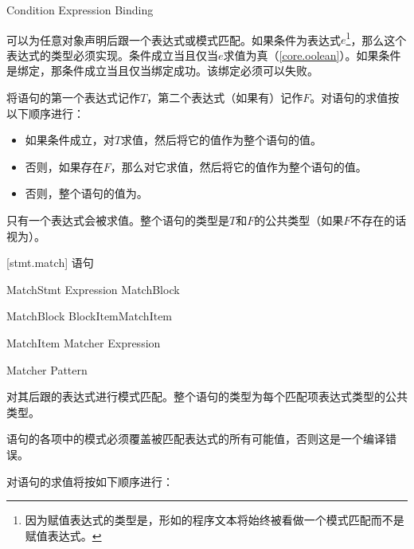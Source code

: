 \begin{bnf}{Condition}
    Expression \br
    Binding
\end{bnf}

\pnum
{}可以为任意对象声明后跟一个表达式或模式匹配。如果条件为表达式$e$\footnote{因为赋值表达式的类型是，形如的程序文本将始终被看做一个模式匹配而不是赋值表达式。}，那么这个表达式的类型必须实现。条件成立当且仅当$e$求值为真（\ref{core.oolean}）。如果条件是绑定，那条件成立当且仅当绑定成功。该绑定必须可以失败。

\pnum
将语句的第一个表达式记作$T$，第二个表达式（如果有）记作$F$。对语句的求值按以下顺序进行：

\begin{itemize}

\item 如果条件成立，对$T$求值，然后将它的值作为整个语句的值。
\item 否则，如果存在$F$，那么对它求值，然后将它的值作为整个语句的值。
\item 否则，整个语句的值为\tcode{()}。

\end{itemize}

只有一个表达式会被求值。整个语句的类型是$T$和$F$的公共类型（如果$F$不存在的话视为）。

[stmt.match]{ 语句}

\begin{bnf}{MatchStmt}
     Expression MatchBlock
\end{bnf}

\begin{bnf}{MatchBlock}
    \terminal{\{} BlockItem\bnfs MatchItem\bnfs \terminal{\}}
\end{bnf}

\begin{bnf}{MatchItem}
    Matcher Expression\bnfp
\end{bnf}

\begin{bnf}{Matcher}
    Pattern \terminal{->}
\end{bnf}

\pnum
{}对其后跟的表达式进行模式匹配。整个语句的类型为每个匹配项表达式类型的公共类型。

\pnum
{}语句的各项中的模式必须覆盖被匹配表达式的所有可能值，否则这是一个编译错误。

\pnum
对语句的求值将按如下顺序进行：

